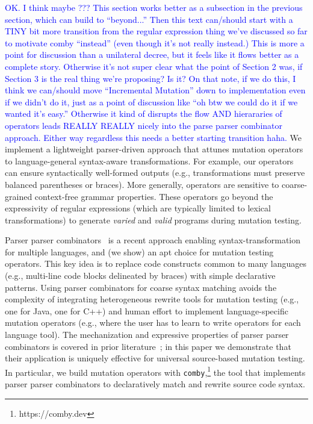\documentclass[sigconf,review, anonymous]{acmart}
\newcommand{\clg}[1]{\textcolor{blue}{#1}}
\begin{document}
{\clg{OK.  I think maybe ??? This section works better as a subsection in the
  previous section, which can build to ``beyond...'' Then this text can/should
  start with a TINY bit more transition from the regular expression thing we've
  discussed so far to motivate comby ``instead'' (even though it's not really
  instead.)  This is more a point for discussion than a unilateral decree, but
  it feels like it flows better as a complete story.  Otherwise it's not super
  clear what the point of Section 2 was, if Section 3 is the real thing we're
  proposing? Is it? On that note, if we do this, I think we can/should move
  ``Incremental Mutation'' down to implementation even if we didn't do it, just
  as a point of discussion like ``oh btw we could do it if we wanted it's
  easy.'' Otherwise it kind of disrupts the flow AND hierararies of operators
  leads REALLY REALLY nicely into the parse parser combinator approach.}
\clg{Either way regardless this needs a better starting transition haha.}
We implement a lightweight parser-driven approach that attunes mutation
operators to language-general syntax-aware transformations. For example, our
operators can ensure syntactically well-formed outputs (e.g., transformations
must preserve balanced parentheses or braces). More generally, operators are
sensitive to coarse-grained context-free grammar properties. These operators go
beyond the expressivity of regular expressions (which are typically limited to
lexical transformations) to generate \emph{varied} and \emph{valid}
programs during mutation testing.

Parser parser combinators~\cite{vanTonderPPC} is a recent approach enabling
syntax-transformation for multiple languages, and (we show) an apt choice for
mutation testing operators. This key idea is to replace code constructs
common to many languages (e.g., multi-line code blocks delineated by braces)
with simple declarative patterns. Using parser combinators for coarse syntax
matching avoids the complexity of integrating heterogeneous rewrite tools for
mutation testing (e.g., one for Java, one for C++) and human effort to
implement language-specific mutation operators (e.g., where the user has to
learn to write operators for each language tool). The mechanization and
expressive properties of parser parser combinators is covered in prior
literature~\cite{vanTonderPPC}; in this paper we demonstrate that their application is
uniquely effective for universal source-based mutation testing. In
particular, we
build mutation operators with \texttt{comby},\footnote{https://comby.dev} the tool that implements parser parser
combinators to declaratively match and rewrite source code syntax. 

}
\end{document}
